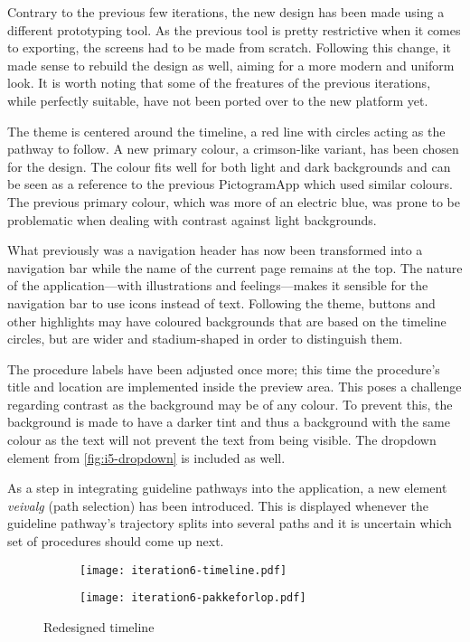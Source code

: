 Contrary to the previous few iterations, the new design has been made using a different prototyping tool. As the previous tool is pretty restrictive when it comes to exporting, the screens had to be made from scratch. Following this change, it made sense to rebuild the design as well, aiming for a more modern and uniform look. It is worth noting that some of the freatures of the previous iterations, while perfectly suitable, have not been ported over to the new platform yet.

The theme is centered around the timeline, a red line with circles acting as the pathway to follow. A new primary colour, a crimson-like variant, has been chosen for the design. The colour fits well for both light and dark backgrounds and can be seen as a reference to the previous PictogramApp which used similar colours. The previous primary colour, which was more of an electric blue, was prone to be problematic when dealing with contrast against light backgrounds.

What previously was a navigation header has now been transformed into a navigation bar while the name of the current page remains at the top. The nature of the application---with illustrations and feelings---makes it sensible for the navigation bar to use icons instead of text. Following the theme, buttons and other highlights may have coloured backgrounds that are based on the timeline circles, but are wider and stadium-shaped in order to distinguish them.

The procedure labels have been adjusted once more; this time the procedure's title and location are implemented inside the preview area. This poses a challenge regarding contrast as the background may be of any colour. To prevent this, the background is made to have a darker tint and thus a background with the same colour as the text will not prevent the text from being visible. The dropdown element from \autoref{fig:i5-dropdown} is included as well.

As a step in integrating guideline pathways into the application, a new element \emph{veivalg} (path selection) has been introduced. This is displayed whenever the guideline pathway's trajectory splits into several paths and it is uncertain which set of procedures should come up next.

\begin{figure}
    \centering
    \begin{subfigure}[t]{0.45\textwidth}
        \centering
        \vspace{0pt}
        \texttt{[image: iteration6-timeline.pdf]}
        \label{fig:i6-timeline-zoomin}
    \end{subfigure}
    \begin{subfigure}[t]{0.45\textwidth}
        \centering
        \vspace{0pt}
        \texttt{[image: iteration6-pakkeforlop.pdf]}
        \label{fig:i6-timeline-zoomout}
    \end{subfigure}
    \caption{Redesigned timeline}
    \label{fig:i6-timeline}
\end{figure}

